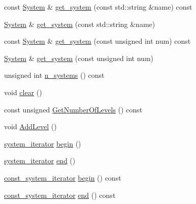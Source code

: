 \begin{DoxyCompactItemize}
\item 
const \mbox{\hyperlink{classfemus_1_1_system}{System}} \& \mbox{\hyperlink{classfemus_1_1_multi_level_problem_a1c5846c64c392348743a2a7b23cef9e7}{get\+\_\+system}} (const std\+::string \&name) const
\item 
\mbox{\hyperlink{classfemus_1_1_system}{System}} \& \mbox{\hyperlink{classfemus_1_1_multi_level_problem_aa83c691a43510a2dc63be58ec7ee70b4}{get\+\_\+system}} (const std\+::string \&name)
\item 
const \mbox{\hyperlink{classfemus_1_1_system}{System}} \& \mbox{\hyperlink{classfemus_1_1_multi_level_problem_a8c9768235a89327d0326e275094fb46a}{get\+\_\+system}} (const unsigned int num) const
\item 
\mbox{\hyperlink{classfemus_1_1_system}{System}} \& \mbox{\hyperlink{classfemus_1_1_multi_level_problem_a4012d3dbe706700f438dd5b57cb42d41}{get\+\_\+system}} (const unsigned int num)
\item 
unsigned int \mbox{\hyperlink{classfemus_1_1_multi_level_problem_a4c2f6ed42514f3ce725df0c265c1404d}{n\+\_\+systems}} () const
\item 
void \mbox{\hyperlink{classfemus_1_1_multi_level_problem_a53549f240c0fd4b37e1a277f27ab7495}{clear}} ()
\item 
const unsigned \mbox{\hyperlink{classfemus_1_1_multi_level_problem_a683d537684061d92dc0daf4cf40fe831}{Get\+Number\+Of\+Levels}} () const
\item 
void \mbox{\hyperlink{classfemus_1_1_multi_level_problem_a04443ff7c4b5db510a4904fff2cf0c36}{Add\+Level}} ()
\item 
\mbox{\hyperlink{classfemus_1_1_multi_level_problem_a0b963c16fa79db05093ceefa48cfe6f2}{system\+\_\+iterator}} \mbox{\hyperlink{classfemus_1_1_multi_level_problem_a80af4ecd1c49cefb92b38da8b193eceb}{begin}} ()
\item 
\mbox{\hyperlink{classfemus_1_1_multi_level_problem_a0b963c16fa79db05093ceefa48cfe6f2}{system\+\_\+iterator}} \mbox{\hyperlink{classfemus_1_1_multi_level_problem_a380a034742259f88f121b965ffd1ee04}{end}} ()
\item 
\mbox{\hyperlink{classfemus_1_1_multi_level_problem_a8bf081f150a9e5685fc9281fc1dccd16}{const\+\_\+system\+\_\+iterator}} \mbox{\hyperlink{classfemus_1_1_multi_level_problem_a58fd8b551b33b7b69a89e0a5eefd3837}{begin}} () const
\item 
\mbox{\hyperlink{classfemus_1_1_multi_level_problem_a8bf081f150a9e5685fc9281fc1dccd16}{const\+\_\+system\+\_\+iterator}} \mbox{\hyperlink{classfemus_1_1_multi_level_problem_a1e4f29a2bd285914e27e6cbad41129a9}{end}} () const

\end{DoxyCompactItemize}
